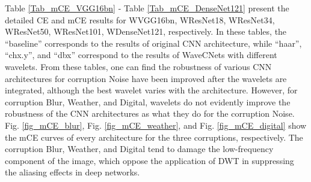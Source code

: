 Table \ref{Tab_mCE_VGG16bn} - Table \ref{Tab_mCE_DenseNet121} present the detailed CE and mCE results for
WVGG16bn, WResNet18, WResNet34, WResNet50, WResNet101, WDenseNet121, respectively.
In these tables, the ``baseline'' corresponds to the results of original CNN architecture,
while ``haar'', ``chx.y'', and ``dbx'' correspond to the results of WaveCNets with different wavelets.
From these tables, one can find the robustness of various CNN architectures for corruption Noise
have been improved after the wavelets are integrated,
although the best wavelet varies with the architecture.
However, for corruption Blur, Weather, and Digital, wavelets do not evidently improve the robustness of the CNN architectures 
as what they do for the corruption Noise.
Fig. \ref{fig_mCE_blur}, Fig. \ref{fig_mCE_weather}, and Fig. \ref{fig_mCE_digital} 
show the mCE curves of every architecture for the three corruptions, respectively.
The corruption Blur, Weather, and Digital tend to damage the low-frequency component of the image,
which oppose the application of DWT in suppressing the aliasing effects in deep networks.

